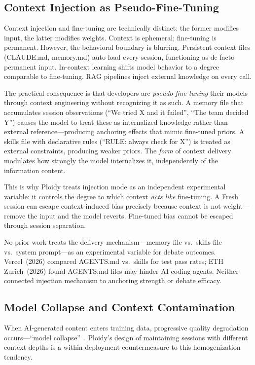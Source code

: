 \documentclass[11pt]{article}
\begin{document}
\subsection{Context Injection as Pseudo-Fine-Tuning}
\label{sec:injection-related}

Context injection and fine-tuning are technically distinct: the former modifies input, the latter modifies weights. Context is ephemeral; fine-tuning is permanent. However, the behavioral boundary is blurring. Persistent context files (CLAUDE.md, memory.md) auto-load every session, functioning as de facto permanent input. In-context learning shifts model behavior to a degree comparable to fine-tuning. RAG pipelines inject external knowledge on every call.

The practical consequence is that developers are \emph{pseudo-fine-tuning} their models through context engineering without recognizing it as such. A memory file that accumulates session observations (``We tried X and it failed'', ``The team decided Y'') causes the model to treat these as internalized knowledge rather than external reference---producing anchoring effects that mimic fine-tuned priors. A skills file with declarative rules (``RULE: always check for X'') is treated as external constraints, producing weaker priors. The \emph{form} of context delivery modulates how strongly the model internalizes it, independently of the information content.

This is why Ploidy treats injection mode as an independent experimental variable: it controls the degree to which context \emph{acts like} fine-tuning. A Fresh session can escape context-induced bias precisely because context is not weight---remove the input and the model reverts. Fine-tuned bias cannot be escaped through session separation.

No prior work treats the delivery mechanism---memory file vs.\ skills file vs.\ system prompt---as an experimental variable for debate outcomes. Vercel~(2026) compared AGENTS.md vs.\ skills for test pass rates; ETH Zurich~(2026) found AGENTS.md files may hinder AI coding agents. Neither connected injection mechanism to anchoring strength or debate efficacy.

\subsection{Model Collapse and Context Contamination}
\label{sec:collapse}

When AI-generated content enters training data, progressive quality degradation occurs---``model collapse''~\citep{shumailov2024collapse}. Ploidy's design of maintaining sessions with different context depths is a within-deployment countermeasure to this homogenization tendency.
\end{document}
